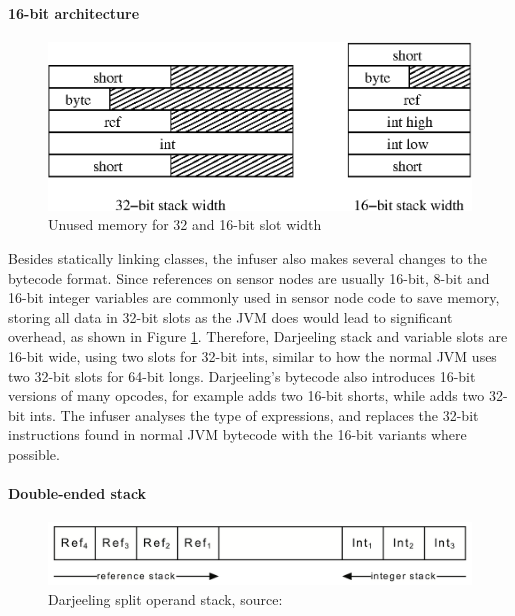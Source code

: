 \paragraph{16-bit architecture}
\begin{figure}
\centering
\includegraphics[width=0.6\linewidth]{32bit-vs-16bit-stack}
\caption{Unused memory for 32 and 16-bit slot width}
\label{fig-32bit-vs-16bit-stack}
\end{figure}

Besides statically linking classes, the infuser also makes several changes to the bytecode format. Since references on sensor nodes are usually 16-bit, 8-bit and 16-bit integer variables are commonly used in sensor node code to save memory, storing all data in 32-bit slots as the JVM does would lead to significant overhead, as shown in Figure \ref{fig-32bit-vs-16bit-stack}. Therefore, Darjeeling stack and variable slots are 16-bit wide, using two slots for 32-bit ints, similar to how the normal JVM uses two 32-bit slots for 64-bit longs. Darjeeling's bytecode also introduces 16-bit versions of many opcodes, for example  adds two 16-bit shorts, while  adds two 32-bit ints. The infuser analyses the type of expressions, and replaces the 32-bit instructions found in normal JVM bytecode with the 16-bit variants where possible.



\paragraph{Double-ended stack}
\begin{figure}
\centering
\includegraphics[width=0.6\linewidth]{darjeeling-split-stack}
\caption[Darjeeling split operand stack]{Darjeeling split operand stack, source: \cite{Brouwers:2009cj}}
\label{fig-darjeeling-split-stack}
\end{figure}

